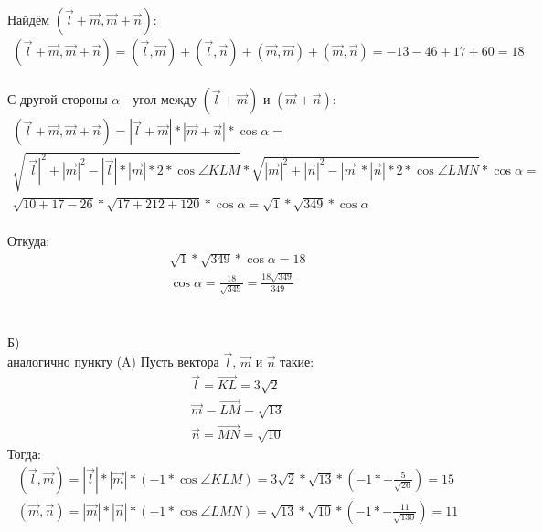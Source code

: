 		\\	
		Найдём $(\overrightarrow{l} + \overrightarrow{m}, \overrightarrow{m} + \overrightarrow{n})$: 	
		\begin{gather*} 
			(\overrightarrow{l} + \overrightarrow{m}, \overrightarrow{m} + \overrightarrow{n}) = (\overrightarrow{l}, \overrightarrow{m}) + (\overrightarrow{l}, \overrightarrow{n}) + (\overrightarrow{m}, \overrightarrow{m}) + (\overrightarrow{m}, \overrightarrow{n}) = -13 - 46 + 17 + 60 = 18
		\end{gather*}
		\\
		С другой стороны $\alpha$ - угол между $(\overrightarrow{l} + \overrightarrow{m})$ и $(\overrightarrow{m} + \overrightarrow{n})$:
		\begin{gather*} 
			(\overrightarrow{l} + \overrightarrow{m}, \overrightarrow{m} + \overrightarrow{n}) = |\overrightarrow{l} + \overrightarrow{m}|*|\overrightarrow{m} + \overrightarrow{n}|*\cos\alpha = \\
			\sqrt{|\overrightarrow{l}|^2 + |\overrightarrow{m}|^2 - |\overrightarrow{l}|*|\overrightarrow{m}|*2*\cos\angle KLM}*\sqrt{|\overrightarrow{m}|^2 + |\overrightarrow{n}|^2 - |\overrightarrow{m}|*|\overrightarrow{n}|*2*\cos\angle LMN}*\cos\alpha = \\
			\sqrt{10 + 17 - 26}*\sqrt{17 + 212 + 120}*\cos\alpha = \sqrt{1}*\sqrt{349}*\cos\alpha
		\end{gather*}
		\\
		Откуда:
		\begin{gather*} 
			\sqrt{1}*\sqrt{349}*\cos\alpha = 18\\
			\cos\alpha = \frac{18}{\sqrt{349}} = \frac{18\sqrt{349}}{349}
		\end{gather*}	
		\\ \\
		Б)\\
		аналогично пункту (A)	
		Пусть вектора $\overrightarrow{l}$, $\overrightarrow{m}$ и $\overrightarrow{n}$ такие: 
		\begin{gather*} 
			\overrightarrow{l} = \overrightarrow{KL} = 3\sqrt{2}\\
			\overrightarrow{m} = \overrightarrow{LM} = \sqrt{13}\\
			\overrightarrow{n} = \overrightarrow{MN} = \sqrt{10}
		\end{gather*}	
		Тогда: 
		\begin{gather*} 
			(\overrightarrow{l}, \overrightarrow{m}) = |\overrightarrow{l}|*|\overrightarrow{m}|*(-1*\cos\angle KLM) = 3\sqrt{2} * \sqrt{13} * (-1 * -\frac{5}{\sqrt{26}}) = 15 \\
			(\overrightarrow{m}, \overrightarrow{n}) = |\overrightarrow{m}|*|\overrightarrow{n}|*(-1*\cos\angle LMN) = \sqrt{13} * \sqrt{10} * (-1 * -\frac{11}{\sqrt{130}}) = 11
		\end{gather*}
